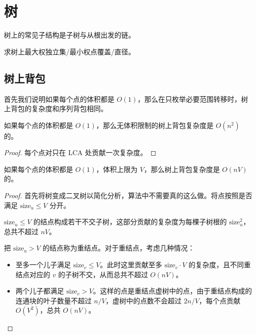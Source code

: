 \begin{exercise}[{[THUPC 2023 初赛] 背包}]
\end{exercise}

\section{树}

树上的常见子结构是子树与从根出发的链。

\begin{example}[经典问题]
    求树上最大权独立集/最小权点覆盖/直径。
\end{example}

\subsection{树上背包}

首先我们说明如果每个点的体积都是 $O(1)$，那么在只枚举必要范围转移时，树上背包的复杂度和序列背包相同。

\begin{theorem}
    如果每个点的体积都是 $O(1)$，那么无体积限制的树上背包复杂度是 $O(n^2)$ 的。
\end{theorem}
\begin{proof}
    每个点对只在 LCA 处贡献一次复杂度。
\end{proof}

\begin{theorem}
    如果每个点的体积都是 $O(1)$，体积上限为 $V$，那么树上背包复杂度是 $O(nV)$ 的。
\end{theorem}
\begin{proof}
    首先将树变成二叉树以简化分析，算法中不需要真的这么做。将点按照是否满足 $\mathrm{size}_u\le V$ 分开。
    
    $\mathrm{size}_u\le V$ 的结点构成若干不交子树，这部分贡献的复杂度为每棵子树根的 $\mathrm{size}_u^2$，总共不超过 $nV$。

    把 $\mathrm{size}_u>V$ 的结点称为重结点。对于重结点，考虑几种情况：
    \begin{itemize}
        \item 至多一个儿子满足 $\mathrm{size}_v\le V$。此时这里贡献至多 $\mathrm{size}_v\cdot V$ 的复杂度，且不同重结点对应的 $v$ 的子树不交，从而总共不超过 $O(nV)$。
        \item 两个儿子都满足 $\mathrm{size}_v> V$。这样的点是重结点虚树中的点，由于重结点构成的连通块的叶子数量不超过 $n/V$，虚树中的点数不会超过 $2n/V$，每个点贡献 $O(V^2)$，总共 $O(nV)$。
    \end{itemize}
\end{proof}

